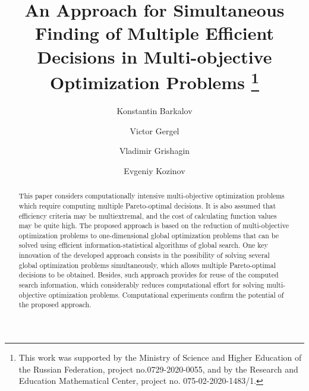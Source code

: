 \documentclass[runningheads]{llncs}
\begin{document}
%
\title{An Approach for Simultaneous Finding of Multiple Efficient Decisions in Multi-objective Optimization Problems
\thanks{This work was supported by the Ministry of Science and Higher Education of the Russian Federation, project no.0729-2020-0055, and by the Research and Education Mathematical Center, project no. 075-02-2020-1483/1.}}
%
%
\author{Konstantin Barkalov \and
Victor Gergel \and
Vladimir Grishagin \and
Evgeniy Kozinov 
}
%
%
%
\maketitle              %
%
\begin{abstract}
This paper considers computationally intensive multi-objective optimization problems which require computing multiple Pareto-optimal decisions. It is also assumed that efficiency criteria may be multiextremal, and the cost of calculating function values may be quite high. The proposed approach is based on the reduction of multi-objective optimization problems to one-dimensional global optimization problems that can be solved using efficient information-statistical algorithms of global search. One key innovation of the developed approach consists in the possibility of solving several global optimization problems simultaneously, which allows multiple Pareto-optimal decisions to be obtained. Besides, such approach provides for reuse of the computed search information, which considerably reduces computational effort for solving multi-objective optimization problems. Computational experiments confirm the potential of the proposed approach.

\end{abstract}
%
%
%
\end{document}
